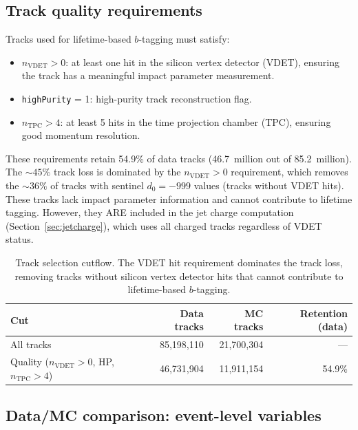 \documentclass[11pt,a4paper]{article}
\begin{document}
\subsection{Track quality requirements}
\label{sec:track_quality}

Tracks used for lifetime-based $b$-tagging must satisfy:
\begin{itemize}
\item $n_\mathrm{VDET} > 0$: at least one hit in the silicon vertex detector (VDET),
ensuring the track has a meaningful impact parameter measurement.
\item \texttt{highPurity} = 1: high-purity track reconstruction flag.
\item $n_\mathrm{TPC} > 4$: at least 5 hits in the time projection chamber (TPC),
ensuring good momentum resolution.
\end{itemize}

These requirements retain 54.9\% of data tracks (46.7~million out of 85.2~million).
The $\sim 45\%$ track loss is dominated by the $n_\mathrm{VDET} > 0$ requirement,
which removes the $\sim 36\%$ of tracks with sentinel $d_0 = -999$ values (tracks
without VDET hits). These tracks lack impact parameter information and cannot
contribute to lifetime tagging. However, they ARE included in the jet charge
computation (Section~\ref{sec:jetcharge}), which uses all charged tracks regardless
of VDET status.

\begin{table}[htbp]
\centering
\caption{Track selection cutflow. The VDET hit requirement dominates the track loss,
removing tracks without silicon vertex detector hits that cannot contribute to
lifetime-based $b$-tagging.}
\label{tab:track_cutflow}
\begin{tabular}{lrrr}
\toprule
Cut & Data tracks & MC tracks & Retention (data) \\
\midrule
All tracks & 85,198,110 & 21,700,304 & --- \\
Quality ($n_\mathrm{VDET} > 0$, HP, $n_\mathrm{TPC} > 4$) & 46,731,904 & 11,911,154 & 54.9\% \\
\bottomrule
\end{tabular}
\end{table}

\subsection{Data/MC comparison: event-level variables}
\label{sec:datamc_event}
\end{document}
